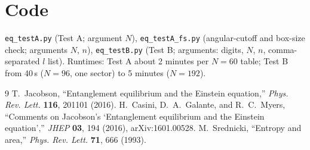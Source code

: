 \documentclass[11pt]{article}
\begin{document}
\section*{Code}
\texttt{eq\_testA.py} (Test A; argument $N$), \texttt{eq\_testA\_fs.py} (angular-cutoff and box-size check; arguments $N$, $n$), \texttt{eq\_testB.py} (Test B; arguments: digits, $N$, $n$, comma-separated $l$ list). Runtimes: Test A about 2 minutes per $N=60$ table; Test B from 40\,s ($N=96$, one sector) to 5 minutes ($N=192$).

\begin{thebibliography}{9}
 T.~Jacobson, ``Entanglement equilibrium and the Einstein equation,'' \emph{Phys. Rev. Lett.} \textbf{116}, 201101 (2016).
 H.~Casini, D.~A.~Galante, and R.~C.~Myers, ``Comments on Jacobson's `Entanglement equilibrium and the Einstein equation','' \emph{JHEP} \textbf{03}, 194 (2016), arXiv:1601.00528.
 M.~Srednicki, ``Entropy and area,'' \emph{Phys. Rev. Lett.} \textbf{71}, 666 (1993).
\end{thebibliography}
\end{document}
